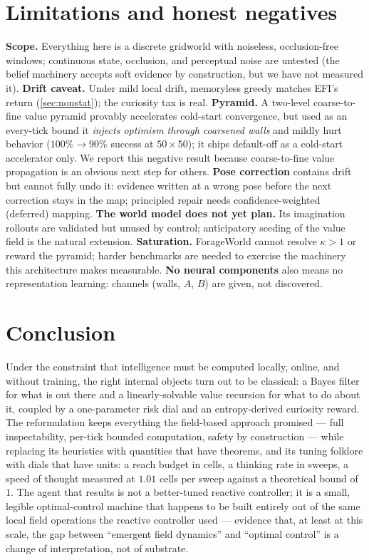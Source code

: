 \documentclass[11pt]{article}
\begin{document}
\section{Limitations and honest negatives}
\label{sec:limitations}
\textbf{Scope.} Everything here is a discrete gridworld with noiseless, occlusion-free windows; continuous state, occlusion, and perceptual noise are untested (the belief machinery accepts soft evidence by construction, but we have not measured it). \textbf{Drift caveat.} Under mild local drift, memoryless greedy matches EFI's return (\cref{sec:nonstat}); the curiosity tax is real. \textbf{Pyramid.} A two-level coarse-to-fine value pyramid provably accelerates cold-start convergence, but used as an every-tick bound it \emph{injects optimism through coarsened walls} and mildly hurt behavior ($100\%\to90\%$ success at $50{\times}50$); it ships default-off as a cold-start accelerator only. We report this negative result because coarse-to-fine value propagation is an obvious next step for others. \textbf{Pose correction} contains drift but cannot fully undo it: evidence written at a wrong pose before the next correction stays in the map; principled repair needs confidence-weighted (deferred) mapping. \textbf{The world model does not yet plan.} Its imagination rollouts are validated but unused by control; anticipatory seeding of the value field is the natural extension. \textbf{Saturation.} ForageWorld cannot resolve $\kappa>1$ or reward the pyramid; harder benchmarks are needed to exercise the machinery this architecture makes measurable. \textbf{No neural components} also means no representation learning: channels (walls, $A$, $B$) are given, not discovered.

\section{Conclusion}
Under the constraint that intelligence must be computed locally, online, and without training, the right internal objects turn out to be classical: a Bayes filter for what is out there and a linearly-solvable value recursion for what to do about it, coupled by a one-parameter risk dial and an entropy-derived curiosity reward. The reformulation keeps everything the field-based approach promised --- full inspectability, per-tick bounded computation, safety by construction --- while replacing its heuristics with quantities that have theorems, and its tuning folklore with dials that have units: a reach budget in cells, a thinking rate in sweeps, a speed of thought measured at $1.01$ cells per sweep against a theoretical bound of $1$. The agent that results is not a better-tuned reactive controller; it is a small, legible optimal-control machine that happens to be built entirely out of the same local field operations the reactive controller used --- evidence that, at least at this scale, the gap between ``emergent field dynamics'' and ``optimal control'' is a change of interpretation, not of substrate.
\end{document}
